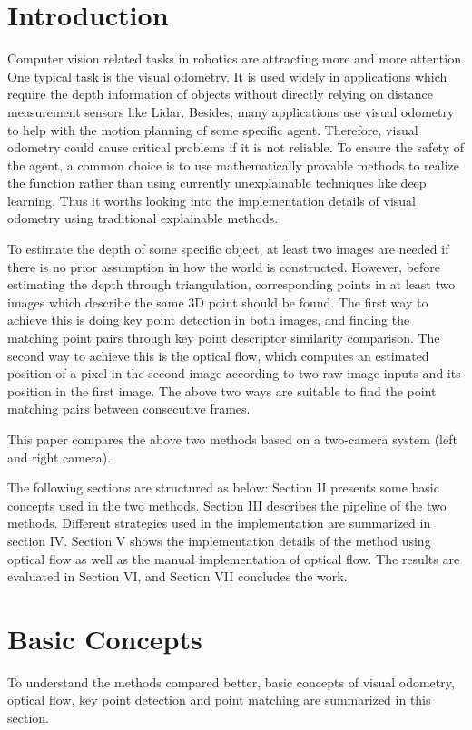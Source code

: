 \documentclass{easychair}
\begin{document}
\section{Introduction}
Computer vision related tasks in robotics are attracting more and more attention. One typical task is the visual odometry. It is used widely in applications which require the depth information of objects without directly relying on distance measurement sensors like Lidar. Besides, many applications use visual odometry to help with the motion planning of some specific agent. Therefore, visual odometry could cause critical problems if it is not reliable. To ensure the safety of the agent, a common choice is to use mathematically provable methods to realize the function rather than using currently unexplainable techniques like deep learning. Thus it worths looking into the implementation details of visual odometry using traditional explainable methods.

To estimate the depth of some specific object, at least two images are needed if there is no prior assumption in how the world is constructed. However, before estimating the depth through triangulation, corresponding points in at least two images which describe the same 3D point should be found. The first way to achieve this is doing key point detection in both images, and finding the matching point pairs through key point descriptor similarity comparison. The second way to achieve this is the optical flow, which computes an estimated position of a pixel in the second image according to two raw image inputs and its position in the first image. The above two ways are suitable to find the point matching pairs between consecutive frames. 

This paper compares the above two methods based on a two-camera system (left and right camera).

The following sections are structured as below: Section II presents some basic concepts used in the two methods. Section III describes the pipeline of the two methods. Different strategies used in the implementation are summarized in section IV. Section V shows the implementation details of the method using optical flow as well as the manual implementation of optical flow. The results are evaluated in Section VI, and Section VII concludes the work.


\section{Basic Concepts}
To understand the methods compared better, basic concepts of visual odometry, optical flow, key point detection and point matching are summarized in this section.
\end{document}
